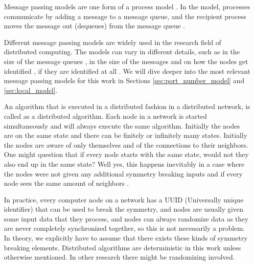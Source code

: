 Message passing models are one form of a process model \cite{DBLP:books/el/leeuwen90/LamportL90}.
In the model, processes communicate by adding a message to a message queue, and the recipient process moves the message out (dequeues) from the message queue \cite{DBLP:books/el/leeuwen90/LamportL90}.

Different message passing models are widely used in the research field of distributed computing.
The models can vary in different details, such as in the size of the message queues \cite{DBLP:books/el/leeuwen90/LamportL90}, in the size of the messages \cite{peleg2000distributed} and on how the nodes get identified \cite{DBLP:conf/focs/Linial87}, if they are identified at all \cite{DBLP:conf/istcs/MayerNS95}.
We will dive deeper into the most relevant message passing models for this work in Sections \ref{sec:port_number_model} and \ref{sec:local_model}.

An algorithm that is executed in a distributed fashion in a distributed network, is called as a distributed algorithm.
Each node in a network is started simultaneously and will always execute the same algorithm.
Initially the nodes are on the same state and there can be finitely or infinitely many states.
Initially the nodes are aware of only themselves and of the connections to their neighbors.
One might question that if every node starts with the same state, would not they also end up in the same state?
Well yes, this happens inevitably in a case where the nodes were not given any additional symmetry breaking inputs and if every node sees the same amount of neighbors \cite{HirvonenSuomelaDistAlg2020}.



In practice, every computer node on a network has a UUID (Universally unique identifier) that can be used to break the symmetry, and nodes are usually given some input data that they process, and nodes can always randomize data as they are never completely synchronized together, so this is not necessarily a problem.
In theory, we explicitly have to assume that there exists these kinds of symmetry breaking elements.
Distributed algorithms are deterministic in this work unless otherwise mentioned.
In other research there might be randomizing involved.



